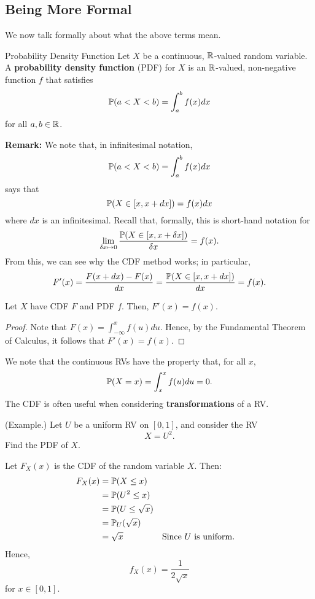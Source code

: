 \documentclass[letterpaper]{article}
\begin{document}
\subsection{Being More Formal}
We now talk formally about what the above terms mean. 
\begin{definition}{Probability Density Function}{}
    Let $X$ be a continuous, $\mathbb{R}$-valued random variable. A \textbf{probability density function} (PDF) for $X$ is an $\mathbb{R}$-valued, non-negative function $f$ that satisfies 
    \[\mathbb{P}(a < X < b) = \int_{a}^{b} f(x) dx\]
    for all $a, b \in \mathbb{R}$. 
\end{definition}
\textbf{Remark:} We note that, in infinitesimal notation, 
\[\mathbb{P}(a < X < b) = \int_{a}^{b} f(x) dx\]
says that 
\[\mathbb{P}(X \in [x, x + dx]) = f(x) dx\]
where $dx$ is an infinitesimal. Recall that, formally, this is short-hand notation for 
\[\lim_{\delta x \mapsto 0} \frac{\mathbb{P}(X \in [x, x + \delta x])}{\delta x} = f(x).\]
From this, we can see why the CDF method works; in particular,
\[F'(x) = \frac{F(x + dx) - F(x)}{dx} = \frac{\mathbb{P}(X \in [x, x + dx])}{dx} = f(x).\]


\begin{theorem}{}{}
    Let $X$ have CDF $F$ and PDF $f$. Then, $F'(x) = f(x)$. 
\end{theorem}

\begin{mdframed}[]
    \begin{proof}
        Note that $F(x) = \int_{-\infty}^x f(u) du$. Hence, by the Fundamental Theorem of Calculus, it follows that $F'(x) = f(x)$. 
    \end{proof}
\end{mdframed}
We note that the continuous RVs have the property that, for all $x$, 
\[\mathbb{P}(X = x) = \int_x^x f(u) du = 0.\]
The CDF is often useful when considering \textbf{transformations} of a RV. 

\begin{mdframed}[]
    (Example.) Let $U$ be a uniform RV on $[0, 1]$, and consider the RV 
    \[X = U^2.\]
    Find the PDF of $X$. 

    \begin{mdframed}[]
        Let $F_{X}(x)$ is the CDF of the random variable $X$. Then: 
        \begin{equation*}
            \begin{aligned}
                F_{X}(x) &= \mathbb{P}(X \leq x) \\ 
                    &= \mathbb{P}(U^2 \leq x) \\ 
                    &= \mathbb{P}(U \leq \sqrt{x}) \\ 
                    &= \mathbb{P}_{U}(\sqrt{x}) \\ 
                    &= \sqrt{x} && \text{Since $U$ is uniform.}
            \end{aligned}
        \end{equation*}
        Hence,
        \[f_{X}(x) = \frac{1}{2\sqrt{x}}\]
        for $x \in [0, 1]$. 
    \end{mdframed}
\end{mdframed}
\end{document}
